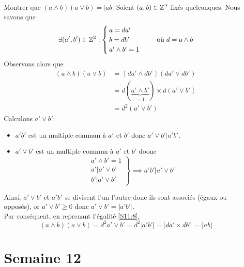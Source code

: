 \documentclass{article}
\renewenvironment{question_kholle}[2][ ]
{
	\subsection{\texorpdfstring{#2}{}}
	\notblank{#1}
	{
		\noindent #1
		\bigbreak
	}
	{}
	\begin{proof}
}
{
	\end{proof}
}
\begin{document}
\begin{question_kholle}{Montrer que $(a\land b)(a\lor b) = |ab|$}
	Soient $(a,b)\in\mathbb Z^{2}$ fixés quelconques. Nous savons que
	\[
		\exists (a', b')\in\mathbb Z^{2}:
		\begin{cases}
			a=da' \\
			b=db' \\
			a'\land b'=1
		\end{cases} \quad \text{ où } d=a\land b
	\]
	Observons alors que
	\begin{align}
		(a\land b)(a\lor b) & =(da'\land db')(da'\lor db')
		\nonumber
		\\
		                    & = d(\underbrace{a'\land b'}_{=1})\times d(a'\lor b') \nonumber \\
		                    & = d^{2}(a'\lor b') \label{S11:8}\tag{$\star$}
	\end{align}
	Calculons $a'\lor b'$:
	\begin{itemize}
		\item $a' b'$ est un multiple commun à $a'$ et $b'$ donc $a'\lor b'
			      \vert a' b'$.
		\item $a'\lor b'$ est un multiple commun à $a'$ et $b'$ doonc
		      \[
			      \left.
			      \begin{array}{l}
				      a'\land b'=1       \\
				      a' \vert a'\lor b' \\
				      b' \vert a'\lor b'
			      \end{array}\right\} \implies  a' b' \vert a'\lor b'
		      \]
	\end{itemize}
	Ainsi, $a'\lor b'$ et $a' b'$ se divisent l’un l’autre donc ils sont
	associés (égaux ou opposés), or $a'\lor b'\geq 0$ donc $a'\lor b'=|a' b'|$.\\
	Par conséquent, en reprenant l’égalité \eqref{S11:8},
	\[
		(a\land b)(a\lor b) = d^{2}a' \lor b' = d^{2} |a' b'| = |da' \times
		db'| = |ab|
	\]

\end{question_kholle}

\pagebreak\section{Semaine 12}
\end{document}
